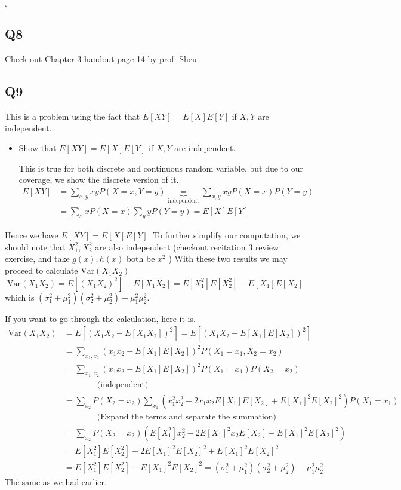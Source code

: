 \documentclass[12pt]{article}
\begin{document}
\hspace{\textwidth}\(\square\) 
\subsection*{Q8}
Check out Chapter 3 handout page 14 by prof. Sheu. 
\subsection*{Q9}
This is a problem using the fact that \textbf{\(E[XY] = E[X]E[Y]\) } if \(X,Y\) are independent. 
\begin{itemize}
    \item Show that \textbf{\(E[XY] = E[X]E[Y]\) } if \(X,Y\) are independent.
    
    This is true for both discrete and continuous random variable, but due to our coverage, we show the discrete version of it. 
    \begin{equation*}
        \begin{aligned}
        E[XY] &= \sum_{x,y} xyP(X=x, Y = y) \underbrace{=}_{\text{independent}} \sum_{x, y}xy P(X = x)P(Y = y)
         \\ &= \sum_{x}x P(X= x) \sum_{y} y P(Y = y)  = E[X]E[Y]
        \end{aligned}
    \end{equation*}
\end{itemize}
Hence we have \(E[XY]= E[X]E[Y]\).  
To further simplify our computation, we should note that \(X_1^2, X_2^2\) are also independent (checkout recitation 3 review exercise, and take \(g(x), h(x)\) both be \(x^2\)  ) 
With these two results we may proceed to calculate \(\text{Var} (X_{1}X_2 )\)
\[
    \text{Var} (X_1 X_2) = E[(X_1 X_2)^2] - E[X_1 X_2] = E[X_1^2]E[X_2^2] - E[X_1]E[X_2]
\]
which is \((\sigma_1^2 + \mu_1^2 )(\sigma_2^2 +\mu_2^2 )  -\mu_1^2 \mu _2^{2} \). 
  

If you want to go through the calculation, here it is.
\begin{equation*}
    \begin{aligned}
        \text{Var} (X_1 X_2) &= E[(X_1 X_2 - E[X_1 X_2])^2] = E[(X_{1} X_2 - E[X_1]E[X_2] )^2]
        \\ & = \sum_{x_1, x_2}(x_1 x_2 -E[X_1]E[X_2])^2 P(X_1 = x_1, X_2 = x_2)  
        \\ &= \sum_{x_1,x_2} (x_1 x_2 -E[X_1]E[X_2])^2 P(X_1 = x_1) P(X_2 = x_2)  
        \\ & \qquad  \qquad \text{(independent)} 
        \\ &= \sum_{x_2}P(X_2 = x_2) \sum_{x_1}   (x_1^2 x_2^2 -2x_{1}x_2E[X_1]E[X_2]+E[X_1]^2E[X_2]^2) P(X_1 = x_1) 
        \\ &  \qquad \qquad\text{(Expand the terms and separate the summation)} 
        \\ &= \sum_{x_2}P(X_2 = x_2)  (E[X_1^2] x_2^2 -2E[X_{1}]^2x_2E[X_2]+E[X_1]^2E[X_2]^2) 
        \\ &= E[X_1^2] E[X_2^2] -2E[X_{1}]^2E[X_2]^2+E[X_1]^2E[X_2]^2
        \\ & = E[X_1^2] E[X_2^2] - E[X_{1}]^2E[X_2]^2 = (\sigma_1^2 + \mu_1^2 )(\sigma_2^2 +\mu_2^2 )  -\mu_1^2 \mu _2^{2}  
    \end{aligned}
\end{equation*}
The same as we had earlier. 
\end{document}
